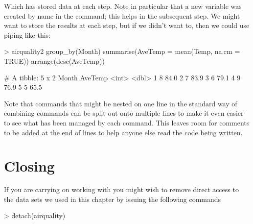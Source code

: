 Which has stored data at each step. Note in particular that a new variable was created by name in the  command; this helps in the subsequent  step. We might want to store the results at each step, but if we didn't want to, then we could use piping like this: 

\begin{Schunk}
\begin{Sinput}
> airquality2 %>% 
   group_by(Month) %>% 
   summarise(AveTemp = mean(Temp, na.rm = TRUE))  %>% 
   arrange(desc(AveTemp)) 
\end{Sinput}
\begin{Soutput}
# A tibble: 5 x 2
  Month AveTemp
  <int>   <dbl>
1     8    84.0
2     7    83.9
3     6    79.1
4     9    76.9
5     5    65.5
\end{Soutput}
\end{Schunk}

 
Note that commands that might be nested on one line in the standard way of combining commands can be split out onto multiple lines to make it even easier to see what has been managed by each command. This leaves room for comments to be added at the end of lines to help anyone else read the code being written. 
 
 
\section{Closing} 
 
If you are carrying on working with \R{} you might wish to remove direct access to the data sets we used in this chapter by issuing the following commands 

\begin{Schunk}
\begin{Sinput}
> detach(airquality) 
\end{Sinput}
\end{Schunk}



